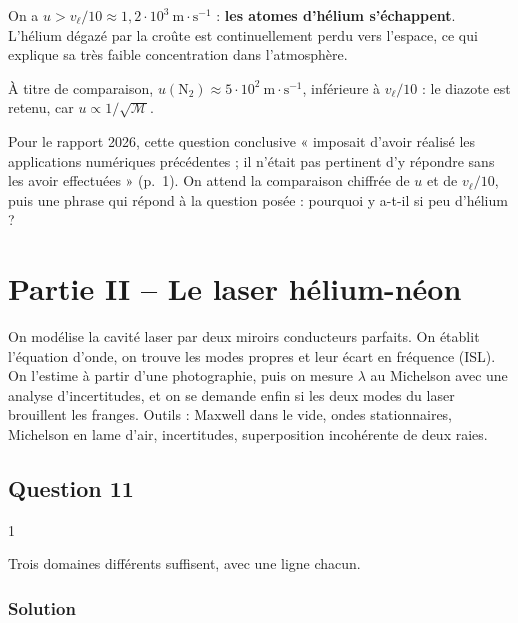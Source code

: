 \documentclass[11pt,a4paper]{article}
\begin{document}
On a \(u>v_\ell/10\approx1{,}2\cdot10^3\ \mathrm{m\cdot s^{-1}}\) : \textbf{les atomes d'hélium s'échappent}. L'hélium dégazé par la croûte est continuellement perdu vers l'espace, ce qui explique sa très faible concentration dans l'atmosphère.

À titre de comparaison, \(u(\mathrm N_2)\approx5\cdot10^2\ \mathrm{m\cdot s^{-1}}\), inférieure à \(v_\ell/10\) : le diazote est retenu, car \(u\propto1/\sqrt{\mathcal M}\).

\begin{jury}

Pour le rapport 2026, cette question conclusive « imposait d'avoir réalisé les applications numériques précédentes ; il n'était pas pertinent d'y répondre sans les avoir effectuées » (p.~1). On attend la comparaison chiffrée de \(u\) et de \(v_\ell/10\), puis une phrase qui répond à la question posée : pourquoi y a-t-il si peu d'hélium ?

\end{jury}

\hypertarget{partie-ii-le-laser-huxe9lium-nuxe9on}{%
\section{Partie II -- Le laser hélium-néon}\label{partie-ii-le-laser-huxe9lium-nuxe9on}}

On modélise la cavité laser par deux miroirs conducteurs parfaits. On établit l'équation d'onde, on trouve les modes propres et leur écart en fréquence (ISL). On l'estime à partir d'une photographie, puis on mesure \(\lambda\) au Michelson avec une analyse d'incertitudes, et on se demande enfin si les deux modes du laser brouillent les franges. Outils : Maxwell dans le vide, ondes stationnaires, Michelson en lame d'air, incertitudes, superposition incohérente de deux raies.

\hypertarget{question-11}{%
\subsection{Question 11}\label{question-11}}

\begin{indication}{1}

Trois domaines différents suffisent, avec une ligne chacun.

\end{indication}

\hypertarget{solution-10}{%
\subsubsection{Solution}\label{solution-10}}
\end{document}
